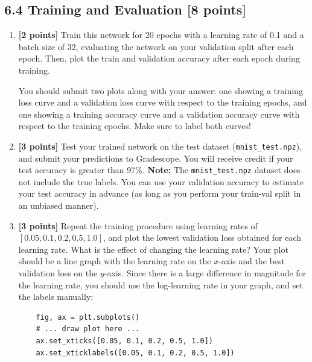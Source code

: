 \documentclass[a3paper,12pt]{extarticle} %
\begin{document}
\subsection*{6.4 Training and Evaluation [8 points]}
\begin{enumerate}
    \item \textbf{[2 points]} Train this network for 20 epochs with a learning rate of 0.1 and a batch size of 32, evaluating the network on your validation split after each epoch. Then, plot the train and validation accuracy after each epoch during training.
   
    You should submit two plots along with your answer: one showing a training loss curve and a validation loss curve with respect to the training epochs, and one showing a training accuracy curve and a validation accuracy curve with respect to the training epochs. Make sure to label both curves!

    \item \textbf{[3 points]} Test your trained network on the test dataset (\texttt{mnist\_test.npz}), and submit your predictions to Gradescope. You will receive credit if your test accuracy is greater than 97\%. \textbf{Note:} The \texttt{mnist\_test.npz} dataset does not include the true labels. You can use your validation accuracy to estimate your test accuracy in advance (as long as you perform your train-val split in an unbiased manner).

    \item \textbf{[3 points]} Repeat the training procedure using learning rates of $[0.05, 0.1, 0.2, 0.5, 1.0]$, and plot the lowest validation loss obtained for each learning rate. What is the effect of changing the learning rate? Your plot should be a line graph with the learning rate on the $x$-axis and the best validation loss on the $y$-axis. Since there is a large difference in magnitude for the learning rate, you should use the log-learning rate in your graph, and set the labels manually:
    \begin{verbatim}
    fig, ax = plt.subplots()
    # ... draw plot here ...
    ax.set_xticks([0.05, 0.1, 0.2, 0.5, 1.0])
    ax.set_xticklabels([0.05, 0.1, 0.2, 0.5, 1.0])
    \end{verbatim}
\end{enumerate}
\end{document}
